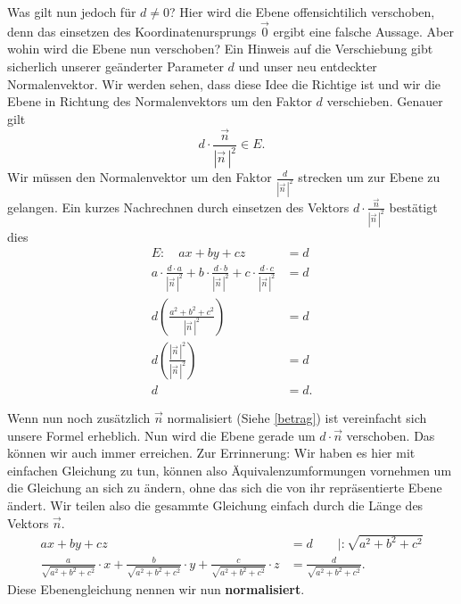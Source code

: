 \documentclass[a4paper,12pt]{article}
\begin{document}
	Was gilt nun jedoch für $d\neq 0$? Hier wird die Ebene offensichtilich verschoben, denn das einsetzen des 
	Koordinatenursprungs $\vec{0}$ ergibt eine falsche Aussage. Aber wohin wird die Ebene nun verschoben?
	Ein Hinweis auf die Verschiebung gibt sicherlich unserer geänderter Parameter $d$ und unser neu entdeckter
	Normalenvektor. Wir werden sehen, dass diese Idee die Richtige ist und wir die Ebene in Richtung des
	Normalenvektors um den Faktor $d$ verschieben. Genauer gilt \[
	d\cdot \frac{\vec{n}}{|\vec{n}\,|^{2}} \in E
	.\] 
	Wir müssen den Normalenvektor um den Faktor $\frac{d}{|\vec{n}\,|^{2}}$ strecken um zur Ebene zu gelangen. 
	Ein kurzes Nachrechnen durch einsetzen des Vektors $d\cdot \frac{\vec{n}}{|\vec{n}\,|^{2}} $ bestätigt dies 
	\begin{align*}
		E: \quad ax+by+cz & = d\\
		a\cdot \frac{d\cdot a}{|\vec{n}\,|^{2}} + b \cdot  \frac{d\cdot b}{|\vec{n}\,|^{2}} +
		c \cdot  \frac{d\cdot c}{|\vec{n}\,|^{2}} &= d\\
		d\left( \frac{a^2+b^{2}+c^{2}}{|\vec{n}\,|^{2}} \right) &=d \\
		d \left( \frac{|\vec{n}\,|^{2}}{|\vec{n}\,|^{2}} \right)&=d\\
		d&=d
	.\end{align*}

	Wenn nun noch zusätzlich $\vec{n}$ normalisiert (Siehe \ref{betrag}) ist vereinfacht sich unsere Formel 
	erheblich. Nun wird die Ebene gerade um  $d\cdot \vec{n}$ verschoben.
	Das können wir auch immer erreichen. Zur Errinnerung: Wir haben es hier mit einfachen Gleichung zu tun,
	können also Äquivalenzumformungen vornehmen um die Gleichung an sich zu ändern, ohne das sich die von ihr 
	repräsentierte Ebene ändert. Wir teilen also die gesammte Gleichung einfach durch die Länge des Vektors
	$\vec{n}$. 
	\begin{align*}
		ax+by+cz &= d \qquad \mid : \sqrt{a^{2} + b^{2}+c^{2}} \\
		\frac{a}{\sqrt{a^{2}+ b^{2}+ c^{2}} }\cdot x + \frac{b}{\sqrt{a^{2}+ b^{2}+c^{2}} }\cdot y
		+ \frac{c}{\sqrt{a^{2}+b^{2}+c^{2}} }\cdot z &= \frac{d}{\sqrt{a^{2}+ b^{2}+c^{2}} }
	.\end{align*}
	Diese Ebenengleichung nennen wir nun \textbf{normalisiert}.\\
\end{document}

